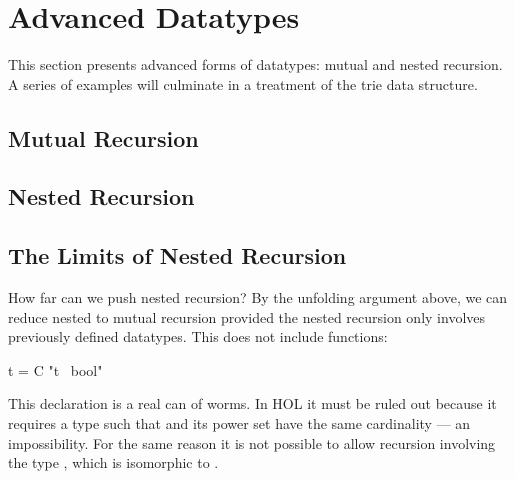 
\begin{exercise}
%
\end{exercise}
\begin{exercise}
%
\end{exercise}




\section{Advanced Datatypes}
\label{sec:advanced-datatypes}

This section presents advanced forms of datatypes: mutual and nested
recursion.  A series of examples will culminate in a treatment of the trie
data structure.


\subsection{Mutual Recursion}
\label{sec:datatype-mut-rec}



\subsection{Nested Recursion}
\label{sec:nested-datatype}

{\makeatother}


\subsection{The Limits of Nested Recursion}
\label{sec:nested-fun-datatype}

How far can we push nested recursion? By the unfolding argument above, we can
reduce nested to mutual recursion provided the nested recursion only involves
previously defined datatypes. This does not include functions:
\begin{isabelle}
 t = C "t \isasymRightarrow\ bool"
\end{isabelle}
This declaration is a real can of worms.
In HOL it must be ruled out because it requires a type
 such that  and its power set  have the
same cardinality --- an impossibility. For the same reason it is not possible
to allow recursion involving the type , which is isomorphic to
.

